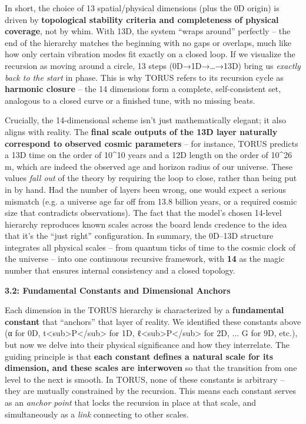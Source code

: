 In short, the choice of 13 spatial/physical dimensions (plus the 0D
origin) is driven by \textbf{topological stability criteria and
completeness of physical coverage}, not by whim​. With 13D, the system
``wraps around'' perfectly -- the end of the hierarchy matches the
beginning with no gaps or overlaps, much like how only certain vibration
modes fit exactly on a closed loop​. If we visualize the recursion as
moving around a circle, 13 steps (0D→1D→\ldots{}→13D) bring us
\emph{exactly back to the start} in phase. This is why TORUS refers to
its recursion cycle as \textbf{harmonic closure} -- the 14 dimensions
form a complete, self-consistent set, analogous to a closed curve or a
finished tune, with no missing beats.

Crucially, the 14-dimensional scheme isn't just mathematically elegant;
it also aligns with reality. The \textbf{final scale outputs of the 13D
layer naturally correspond to observed cosmic parameters} -- for
instance, TORUS predicts a 13D time on the order of 10\^{}10 years and a
12D length on the order of 10\^{}26 m, which are indeed the observed age
and horizon radius of our universe​. These values \emph{fall out} of the
theory by requiring the loop to close, rather than being put in by hand.
Had the number of layers been wrong, one would expect a serious mismatch
(e.g. a universe age far off from 13.8 billion years, or a required
cosmic size that contradicts observations). The fact that the model's
chosen 14-level hierarchy reproduces known scales across the board lends
credence to the idea that it's the ``just right'' configuration. In
summary, the 0D--13D structure integrates all physical scales -- from
quantum ticks of time to the cosmic clock of the universe -- into one
continuous recursive framework, with \textbf{14} as the magic number
that ensures internal consistency and a closed topology​.

\textbf{3.2: Fundamental Constants and Dimensional Anchors}

Each dimension in the TORUS hierarchy is characterized by a
\textbf{fundamental constant} that ``anchors'' that layer of reality. We
identified these constants above (α for 0D,
t\textless{}sub\textgreater{}P\textless{}/sub\textgreater{} for 1D,
ℓ\textless{}sub\textgreater{}P\textless{}/sub\textgreater{} for 2D, ...
G for 9D, etc.), but now we delve into their physical significance and
how they interrelate. The guiding principle is that \textbf{each
constant defines a natural scale for its dimension, and these scales are
interwoven} so that the transition from one level to the next is smooth.
In TORUS, none of these constants is arbitrary -- they are mutually
constrained by the recursion. This means each constant serves as an
\emph{anchor point} that locks the recursion in place at that scale, and
simultaneously as a \emph{link} connecting to other scales.

